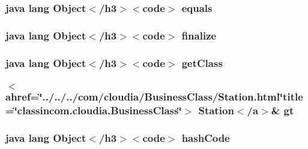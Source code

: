 \hypertarget{_station_group_8html_a8974318cea585f72df717e0380ec7104}{
\subsubsection[{equals}]{\setlength{\rightskip}{0pt plus 5cm}java lang Object$<$/h3$>$$<$code$>$ equals}}\label{_station_group_8html_a8974318cea585f72df717e0380ec7104}
\hypertarget{_station_group_8html_ab2315181ead4aeedef2374039b6ddde7}{
\subsubsection[{finalize}]{\setlength{\rightskip}{0pt plus 5cm}java lang Object$<$/h3$>$$<$code$>$ finalize}}\label{_station_group_8html_ab2315181ead4aeedef2374039b6ddde7}
\hypertarget{_station_group_8html_a98e6644727fe65eac217a6855045be43}{
\subsubsection[{get\-Class}]{\setlength{\rightskip}{0pt plus 5cm}java lang Object$<$/h3$>$$<$code$>$ get\-Class}}\label{_station_group_8html_a98e6644727fe65eac217a6855045be43}
\hypertarget{_station_group_8html_a90aa0357a874ae1fde4b529e1b0f0e40}{
\subsubsection[{gt}]{\setlength{\rightskip}{0pt plus 5cm}$<$ahref=\char`\"{}../../../com/cloudia/Business\-Class/Station.\-html\char`\"{}title=\char`\"{}classincom.\-cloudia.\-Business\-Class\char`\"{}$>$ Station$<$/{\bf a}$>$\& gt}}\label{_station_group_8html_a90aa0357a874ae1fde4b529e1b0f0e40}
\hypertarget{_station_group_8html_a8e178e2bb2bef055ea23ea3910a221ca}{
\subsubsection[{hash\-Code}]{\setlength{\rightskip}{0pt plus 5cm}java lang Object$<$/h3$>$$<$code$>$ hash\-Code}}\label{_station_group_8html_a8e178e2bb2bef055ea23ea3910a221ca}
